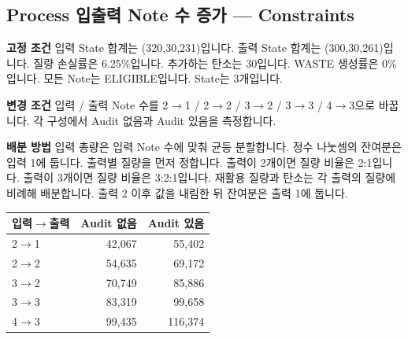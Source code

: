 \documentclass[11pt,a4paper]{article}
\begin{document}
\par\noindent\begin{minipage}{\linewidth}
\subsection*{Process 입출력 Note 수 증가 — Constraints}
\textbf{고정 조건}\newline
입력 State 합계는 (320,30,231)입니다.\newline
출력 State 합계는 (300,30,261)입니다.\newline
질량 손실률은 6.25\%입니다.\newline
추가하는 탄소는 30입니다.\newline
WASTE 생성률은 0\%입니다.\newline
모든 Note는 ELIGIBLE입니다.\newline
State는 3개입니다.\par\smallskip
\textbf{변경 조건}\newline
입력 / 출력 Note 수를 2$\rightarrow$1 / 2$\rightarrow$2 / 3$\rightarrow$2 / 3$\rightarrow$3 / 4$\rightarrow$3으로 바꿉니다.\newline
각 구성에서 Audit 없음과 Audit 있음을 측정합니다.\par\smallskip
\textbf{배분 방법}\newline
입력 총량은 입력 Note 수에 맞춰 균등 분할합니다.\newline
정수 나눗셈의 잔여분은 입력 1에 둡니다.\newline
출력별 질량을 먼저 정합니다.\newline
출력이 2개이면 질량 비율은 2:1입니다.\newline
출력이 3개이면 질량 비율은 3:2:1입니다.\newline
재활용 질량과 탄소는 각 출력의 질량에 비례해 배분합니다.\newline
출력 2 이후 값을 내림한 뒤 잔여분은 출력 1에 둡니다.\par\smallskip
\begin{center}\small\begin{tabular}{@{}lrr@{}}\toprule
\textbf{입력$\rightarrow$출력} & \textbf{Audit 없음} & \textbf{Audit 있음} \\
\midrule
2$\rightarrow$1 & 42,067 & 55,402 \\
2$\rightarrow$2 & 54,635 & 69,172 \\
3$\rightarrow$2 & 70,749 & 85,886 \\
3$\rightarrow$3 & 83,319 & 99,658 \\
4$\rightarrow$3 & 99,435 & 116,374 \\
\bottomrule\end{tabular}\end{center}
\end{minipage}\par\medskip
\end{document}
